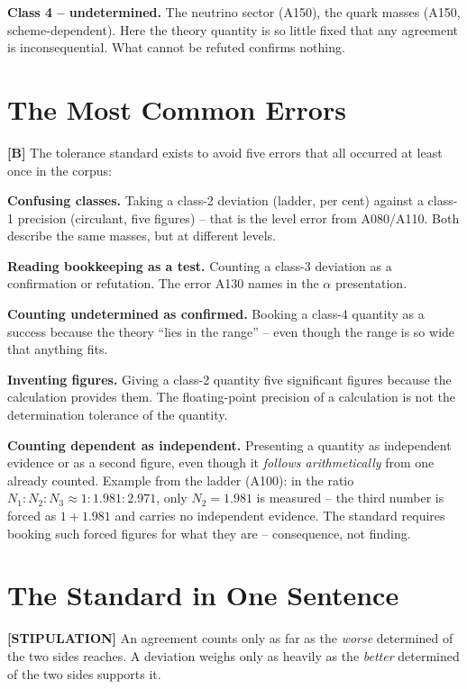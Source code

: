 \textbf{Class 4 -- undetermined.} The neutrino sector (A150), the quark masses
(A150, scheme-dependent). Here the theory quantity is so little fixed that any
agreement is inconsequential. What cannot be refuted confirms nothing.

\section{The Most Common Errors}

\textbf{[B]} The tolerance standard exists to avoid five errors that all occurred
at least once in the corpus:

\textbf{Confusing classes.} Taking a class-2 deviation (ladder, per cent) against
a class-1 precision (circulant, five figures) -- that is the level error from
A080/A110. Both describe the same masses, but at different levels.

\textbf{Reading bookkeeping as a test.} Counting a class-3 deviation as a
confirmation or refutation. The error A130 names in the $\alpha$ presentation.

\textbf{Counting undetermined as confirmed.} Booking a class-4 quantity as a
success because the theory ``lies in the range'' -- even though the range is so
wide that anything fits.

\textbf{Inventing figures.} Giving a class-2 quantity five significant figures
because the calculation provides them. The floating-point precision of a
calculation is not the determination tolerance of the quantity.

\textbf{Counting dependent as independent.} Presenting a quantity as independent
evidence or as a second figure, even though it \emph{follows arithmetically} from
one already counted. Example from the ladder (A100): in the ratio
$N_1{:}N_2{:}N_3 \approx 1{:}1{.}981{:}2{.}971$, only $N_2=1{.}981$ is measured
-- the third number is forced as $1 + 1{.}981$ and carries no independent evidence.
The standard requires booking such forced figures for what they are -- consequence,
not finding.

\section{The Standard in One Sentence}

\textbf{[STIPULATION]} An agreement counts only as far as the \emph{worse}
determined of the two sides reaches. A deviation weighs only as heavily as the
\emph{better} determined of the two sides supports it.

